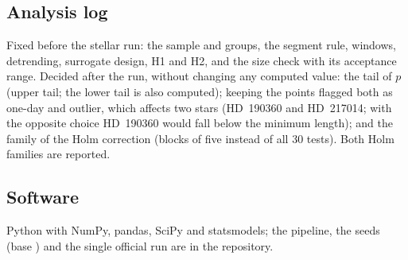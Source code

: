 \subsection{Analysis log}

Fixed before the stellar run: the sample and groups, the segment rule, windows, detrending, surrogate design, H1 and H2, and the size check with its acceptance range. Decided after the run, without changing any computed value: the tail of $p$ (upper tail; the lower tail is also computed); keeping the points flagged both as one-day and outlier, which affects two stars (HD~190360 and HD~217014; with the opposite choice HD~190360 would fall below the minimum length); and the family of the Holm correction (blocks of five instead of all 30 tests). Both Holm families are reported.

\subsection{Software}

Python with NumPy, pandas, SciPy and statsmodels; the pipeline, the seeds (base \SeedBase) and the single official run are in the repository.
